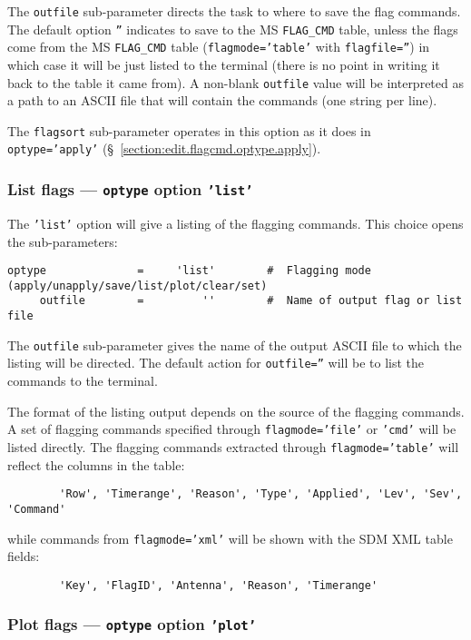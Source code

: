 The {\tt outfile} sub-parameter directs the task to where to save the
flag commands.  The default option {\tt ''} indicates to save to 
the MS {\tt FLAG\_CMD} table, unless the flags come from the MS
{\tt FLAG\_CMD} table ({\tt flagmode='table'} with {\tt flagfile=''})
in which case it will be just listed to the terminal (there is no
point in writing it back to the table it came from).
A non-blank {\tt outfile} value will be interpreted
as a path to an ASCII file that will contain the commands (one string
per line).

The {\tt flagsort} sub-parameter operates in this option as it does in
{\tt optype='apply'} (\S~\ref{section:edit.flagcmd.optype.apply}).

\subsubsection{List flags --- {\tt optype} option {\tt 'list'}}
\label{section:edit.flagcmd.optype.list}

The {\tt 'list'} option will give a listing of the flagging commands.
This choice opens the sub-parameters:
\small
\begin{verbatim}
optype              =     'list'        #  Flagging mode (apply/unapply/save/list/plot/clear/set)
     outfile        =         ''        #  Name of output flag or list file
\end{verbatim}
\normalsize

The {\tt outfile} sub-parameter gives the name of the output ASCII
file to which the listing will be directed.  The default action for
{\tt outfile=''} will be to list the commands to the terminal.

The format of the listing output depends on the source of the flagging
commands. A set of flagging commands specified through 
{\tt flagmode='file'} or {\tt 'cmd'} will be listed directly. The
flagging commands extracted through {\tt flagmode='table'} will
reflect the columns in the table:
\begin{verbatim}
        'Row', 'Timerange', 'Reason', 'Type', 'Applied', 'Lev', 'Sev', 'Command'
\end{verbatim}
while commands from {\tt flagmode='xml'} will be shown with the SDM
XML table fields:
\begin{verbatim}
        'Key', 'FlagID', 'Antenna', 'Reason', 'Timerange'
\end{verbatim}

\subsubsection{Plot flags --- {\tt optype} option {\tt 'plot'}}
\label{section:edit.flagcmd.optype.plot}

